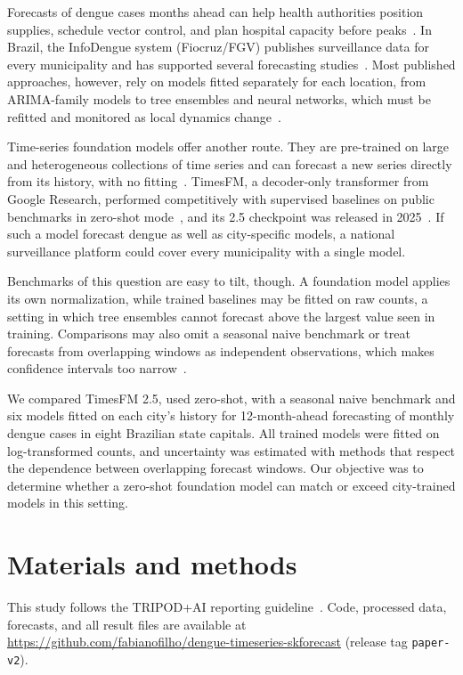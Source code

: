 \documentclass[10pt,letterpaper]{article}
\begin{document}
Forecasts of dengue cases months ahead can help health authorities position supplies, schedule vector control, and plan hospital capacity before peaks~\cite{Roster2022}. In Brazil, the InfoDengue system (Fiocruz/FGV) publishes surveillance data for every municipality and has supported several forecasting studies~\cite{Codeco2018infodengue}. Most published approaches, however, rely on models fitted separately for each location, from ARIMA-family models to tree ensembles and neural networks, which must be refitted and monitored as local dynamics change~\cite{Leung2023,Roster2022,Chen2025lstm}.

Time-series foundation models offer another route. They are pre-trained on large and heterogeneous collections of time series and can forecast a new series directly from its history, with no fitting~\cite{Das2024timesfm,Ansari2024chronos,Woo2024moirai}. TimesFM, a decoder-only transformer from Google Research, performed competitively with supervised baselines on public benchmarks in zero-shot mode~\cite{Das2024timesfm}, and its 2.5 checkpoint was released in 2025~\cite{TimesFM25card}. If such a model forecast dengue as well as city-specific models, a national surveillance platform could cover every municipality with a single model.

Benchmarks of this question are easy to tilt, though. A foundation model applies its own normalization, while trained baselines may be fitted on raw counts, a setting in which tree ensembles cannot forecast above the largest value seen in training. Comparisons may also omit a seasonal naive benchmark or treat forecasts from overlapping windows as independent observations, which makes confidence intervals too narrow~\cite{Hewamalage2023}.

We compared TimesFM 2.5, used zero-shot, with a seasonal naive benchmark and six models fitted on each city's history for 12-month-ahead forecasting of monthly dengue cases in eight Brazilian state capitals. All trained models were fitted on log-transformed counts, and uncertainty was estimated with methods that respect the dependence between overlapping forecast windows. Our objective was to determine whether a zero-shot foundation model can match or exceed city-trained models in this setting.

\section*{Materials and methods}
This study follows the TRIPOD+AI reporting guideline~\cite{Collins2024tripod}. Code, processed data, forecasts, and all result files are available at \url{https://github.com/fabianofilho/dengue-timeseries-skforecast} (release tag \texttt{paper-v2}).
\end{document}
